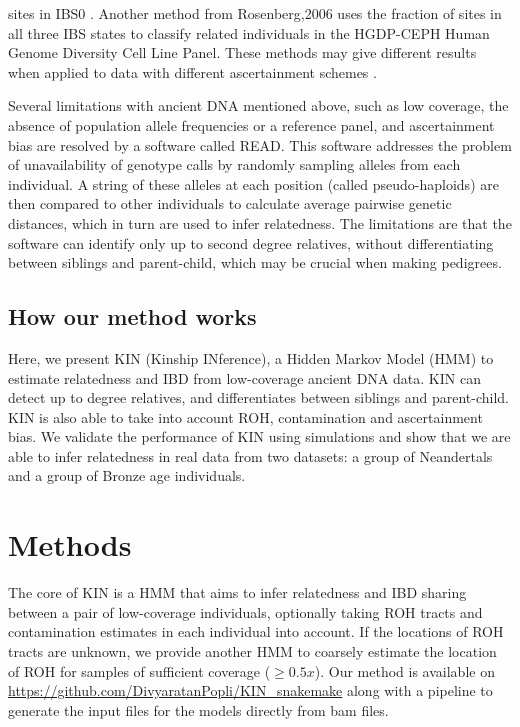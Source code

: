 \documentclass[12pt, letterpaper]{article}
\begin{document}
sites in IBS0 \cite{manichaikul_robust_2010}. Another method from Rosenberg,2006 \cite{rosenberg_standardized_2006} uses the fraction of sites in all three IBS states to classify related individuals in the HGDP-CEPH Human Genome Diversity Cell Line Panel. These methods may give different results when applied to data with different ascertainment schemes \cite{waples_allele_2019}. 

Several limitations with ancient DNA mentioned above, such as low coverage, the absence of population allele frequencies or a reference panel, and ascertainment bias are resolved by a software called READ. This software addresses the problem of unavailability of genotype calls by randomly sampling alleles from each individual. A string of these alleles at each position (called pseudo-haploids) are then compared to other individuals to calculate average pairwise genetic distances, which in turn are used to infer relatedness. The limitations are that the software can identify only up to second degree relatives, without differentiating between siblings and parent-child, which may be crucial when making pedigrees.

\subsection{How our method works}
Here, we present KIN (Kinship INference), a Hidden Markov Model (HMM) to estimate relatedness and IBD from low-coverage ancient DNA data. KIN can detect up to  degree relatives, and differentiates between siblings and parent-child. KIN is also able to take into account ROH, contamination and ascertainment bias. We validate the performance of KIN using simulations and show that we are able to infer relatedness in real data from two datasets: a group of Neandertals and a group of Bronze age individuals.


\section{Methods}

The core of  KIN is a HMM that aims to infer relatedness and IBD sharing between a pair of low-coverage individuals, optionally taking ROH tracts and contamination estimates in each individual into account. If the locations of ROH tracts are unknown, we provide another HMM to coarsely estimate the location of ROH for samples  of sufficient coverage ($\geq 0.5x$). Our method is available on \url{https://github.com/DivyaratanPopli/KIN_snakemake} along with a  \cite{koster_snakemakescalable_2012} pipeline to generate the input files for the models directly from bam files. 
\end{document}
